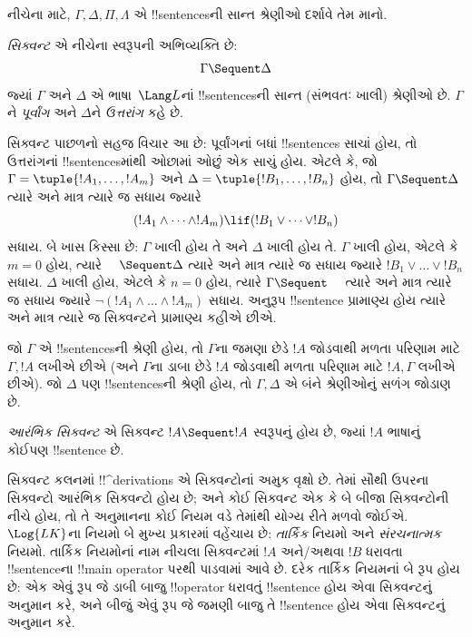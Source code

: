 \documentclass[../../../include/open-logic-section]{subfiles}
\begin{document}
      {}
      {}


નીચેના માટે, $\Gamma, \Delta, \Pi, \Lambda$ એ !!{sentence}sની સાન્ત
શ્રેણીઓ દર્શાવે તેમ માનો.

\begin{defn}[સિક્વન્ટ]
\emph{સિક્વન્ટ} એ નીચેના સ્વરૂપની અભિવ્યક્તિ છે:
\[
\Gamma \Sequent \Delta
\]
જ્યાં $\Gamma$ અને $\Delta$ એ ભાષા~$\Lang L$નાં !!{sentence}sની સાન્ત
(સંભવતઃ ખાલી) શ્રેણીઓ છે. $\Gamma$ને \emph{પૂર્વાંગ} અને $\Delta$ને
\emph{ઉત્તરાંગ} કહે છે.
\end{defn}

\begin{explain}
સિક્વન્ટ પાછળનો સહજ વિચાર આ છે: પૂર્વાંગનાં બધાં !!{sentence}s સાચાં હોય,
તો ઉત્તરાંગનાં !!{sentence}sમાંથી ઓછામાં ઓછું એક સાચું હોય. એટલે કે, જો
$\Gamma = \tuple{!A_1, \dots, !A_m}$ અને
$\Delta = \tuple{!B_1, \dots, !B_n}$ હોય, તો
$\Gamma \Sequent \Delta$ ત્યારે અને માત્ર ત્યારે જ સધાય જ્યારે
\[
(!A_1 \land \cdots \land !A_m) \lif (!B_1 \lor \cdots \lor
!B_n)
\]
સધાય. બે ખાસ કિસ્સા છે: $\Gamma$ ખાલી હોય તે અને $\Delta$ ખાલી હોય તે.
$\Gamma$ ખાલી હોય, એટલે કે $m = 0$ હોય, ત્યારે $\quad \Sequent \Delta$
ત્યારે અને માત્ર ત્યારે જ સધાય જ્યારે $!B_1 \lor \dots \lor !B_n$
સધાય. $\Delta$ ખાલી હોય, એટલે કે $n = 0$ હોય, ત્યારે
$\Gamma \Sequent \quad$ ત્યારે અને માત્ર ત્યારે જ સધાય જ્યારે
$\lnot(!A_1 \land \dots \land !A_m)$ સધાય. અનુરૂપ !!{sentence}
પ્રામાણ્ય હોય ત્યારે અને માત્ર ત્યારે જ સિક્વન્ટને પ્રામાણ્ય કહીએ છીએ.
\end{explain}

જો $\Gamma$ એ !!{sentence}sની શ્રેણી હોય, તો $\Gamma$ના જમણા છેડે
$!A$ જોડવાથી મળતા પરિણામ માટે $\Gamma, !A$ લખીએ છીએ (અને $\Gamma$ના
ડાબા છેડે $!A$ જોડવાથી મળતા પરિણામ માટે $!A, \Gamma$ લખીએ છીએ). જો
$\Delta$ પણ !!{sentence}sની શ્રેણી હોય, તો $\Gamma, \Delta$ એ બંને
શ્રેણીઓનું સળંગ જોડાણ છે.

\begin{defn}[આરંભિક સિક્વન્ટ]
\emph{આરંભિક સિક્વન્ટ} એ સિક્વન્ટ
{$!A \Sequent !A$ સ્વરૂપનું હોય છે}, જ્યાં $!A$ ભાષાનું કોઈપણ
!!{sentence} છે.
\end{defn}

સિક્વન્ટ કલનમાં !!^{derivation}s એ સિક્વન્ટોનાં અમુક વૃક્ષો છે. તેમાં
સૌથી ઉપરના સિક્વન્ટો આરંભિક સિક્વન્ટો હોય છે; અને કોઈ સિક્વન્ટ એક કે બે
બીજા સિક્વન્ટોની નીચે હોય, તો તે અનુમાનના કોઈ નિયમ વડે તેમાંથી યોગ્ય
રીતે મળવો જોઈએ. $\Log{LK}$ના નિયમો બે મુખ્ય પ્રકારમાં વહેંચાય છે:
\emph{તાર્કિક} નિયમો અને \emph{સંરચનાત્મક} નિયમો. તાર્કિક નિયમોનાં નામ
નીચલા સિક્વન્ટમાં $!A$ અને/અથવા $!B$ ધરાવતા !!{sentence}ના
!!{main
  operator} પરથી પાડવામાં આવે છે. દરેક તાર્કિક નિયમનાં બે રૂપ હોય
છે: એક એવું રૂપ જે ડાબી બાજુ !!{operator} ધરાવતું !!{sentence} હોય એવા
સિક્વન્ટનું અનુમાન કરે, અને બીજું એવું રૂપ જે જમણી બાજુ તે !!{sentence}
હોય એવા સિક્વન્ટનું અનુમાન કરે.
\end{document}
